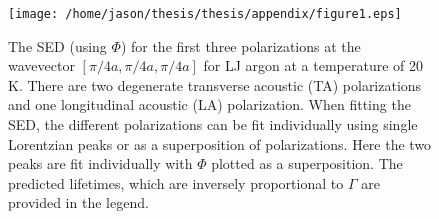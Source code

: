 \vspace*{0mm}
\begin{figure}
\begin{center}
\texttt{[image: /home/jason/thesis/thesis/appendix/figure1.eps]}
\end{center}
\caption{\label{F:LJ_FIT_PEAK} The SED (using $\Phi$) for the first three 
polarizations at 
the wavevector $[\pi/4a,\pi/4a,\pi/4a]$ for LJ argon at a temperature of 
20 K. There are 
two degenerate transverse acoustic (TA) polarizations and one longitudinal 
acoustic (LA) 
polarization. When fitting the SED, the different polarizations can be fit 
individually 
using single Lorentzian peaks or as a superposition of polarizations. Here 
the two peaks 
are fit individually with $\Phi$ plotted as a superposition. The predicted 
lifetimes, 
which are inversely proportional to $\Gamma$ are provided in the legend.}
\end{figure}

